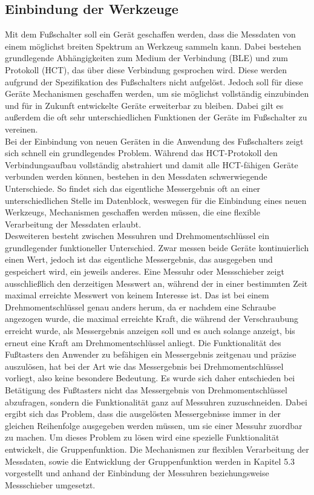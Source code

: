 \subsection{Einbindung der Werkzeuge}
Mit dem Fußschalter soll ein Gerät geschaffen werden, dass die Messdaten von einem möglichst breiten Spektrum an Werkzeug sammeln kann. Dabei bestehen grundlegende Abhängigkeiten zum Medium der Verbindung (\ac{BLE}) und zum Protokoll (\ac{HCT}), das über diese Verbindung gesprochen wird. Diese werden aufgrund der Spezifikation des Fußschalters nicht aufgelöst. Jedoch soll für diese Geräte Mechanismen geschaffen werden, um sie möglichst vollständig einzubinden und für in Zukunft entwickelte Geräte erweiterbar zu bleiben. Dabei gilt es außerdem die oft sehr unterschiedlichen Funktionen der Geräte im Fußschalter zu vereinen.\\
Bei der Einbindung von neuen Geräten in die Anwendung des Fußschalters zeigt sich schnell ein grundlegendes Problem. Während das \ac{HCT}-Protokoll den Verbindungsaufbau vollständig abstrahiert und damit alle \ac{HCT}-fähigen Geräte verbunden werden können, bestehen in den Messdaten schwerwiegende Unterschiede. So findet sich das eigentliche Messergebnis oft an einer unterschiedlichen Stelle im Datenblock, weswegen für die Einbindung eines neuen Werkzeugs, Mechanismen geschaffen werden müssen, die eine flexible Verarbeitung der Messdaten erlaubt.\\
Desweiteren besteht zwischen Messuhren und Drehmomentschlüssel ein grundlegender funktioneller Unterschied. Zwar messen beide Geräte kontinuierlich einen Wert, jedoch ist das eigentliche Messergebnis, das ausgegeben und gespeichert wird, ein jeweils anderes. Eine Messuhr oder Messschieber zeigt ausschließlich den derzeitigen Messwert an, während der in einer bestimmten Zeit maximal erreichte Messwert von keinem Interesse ist. Das ist bei einem Drehmomentschlüssel genau anders herum, da er nachdem eine Schraube angezogen wurde, die maximal erreichte Kraft, die während der Verschraubung erreicht wurde, als Messergebnis anzeigen soll und es auch solange anzeigt, bis erneut eine Kraft am Drehmomentschlüssel anliegt. 
Die Funktionalität des Fußtasters den Anwender zu befähigen ein Messergebnis zeitgenau und präzise auszulösen, hat bei der Art wie das Messergebnis bei Drehmomentschlüssel vorliegt, also keine besondere Bedeutung. Es wurde sich daher entschieden bei Betätigung des Fußtasters nicht das Messergebnis von Drehmomentschlüssel abzufragen, sondern die Funktionalität ganz auf Messuhren zuzuschneiden. Dabei ergibt sich das Problem, dass die ausgelösten Messergebnisse immer in der gleichen Reihenfolge ausgegeben werden müssen, um sie einer Messuhr zuordbar zu machen. Um dieses Problem zu lösen wird eine spezielle Funktionalität entwickelt, die Gruppenfunktion. Die Mechanismen zur flexiblen Verarbeitung der Messdaten, sowie die Entwicklung der Gruppenfunktion werden in Kapitel 5.3 vorgestellt und anhand der Einbindung der Messuhren beziehungsweise Messschieber umgesetzt.\\

